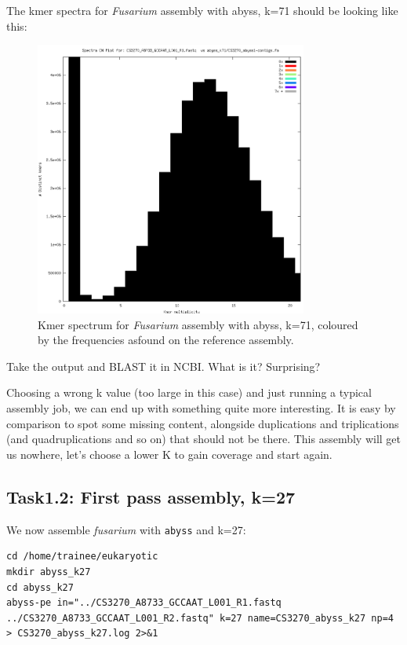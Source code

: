 The kmer spectra for \textit{Fusarium} assembly with abyss, k=71 should be looking like this:
\begin{figure}[H]
\centering
\includegraphics[width=0.8\textwidth]{handout/abyss-k71.png}
\caption{Kmer spectrum for \textit{Fusarium} assembly with abyss, k=71, coloured by the frequencies asfound on the reference assembly.}
\label{fig:fusariumk71}
\end{figure}

Take the output and BLAST it in NCBI. What is it? Surprising?

\begin{steps}
\end{steps}

Choosing a wrong k value (too large in this case) and just running a typical assembly job, we can end up with something quite more interesting. It is easy by comparison to spot some missing content, alongside duplications and triplications (and quadruplications and so on) that should not be there.
This assembly will get us nowhere, let's choose a lower K to gain coverage and start again.

\subsection{Task1.2: First pass assembly, k=27}
\begin{steps}
We now assemble \textit{fusarium} with \texttt{abyss} and k=27:
\begin{lstlisting}
cd /home/trainee/eukaryotic
mkdir abyss_k27
cd abyss_k27
abyss-pe in="../CS3270_A8733_GCCAAT_L001_R1.fastq ../CS3270_A8733_GCCAAT_L001_R2.fastq" k=27 name=CS3270_abyss_k27 np=4 > CS3270_abyss_k27.log 2>&1
\end{lstlisting}
\end{steps}

